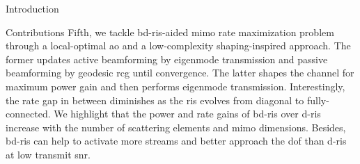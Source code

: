 \documentclass[journal]{IEEEtran}
\begin{document}
\begin{section}{Introduction}
\begin{subsection}{Contributions}
		Fifth, we tackle \gls{bd}-\gls{ris}-aided \gls{mimo} rate maximization problem through a local-optimal \gls{ao} and a low-complexity shaping-inspired approach.
		The former updates active beamforming by eigenmode transmission and passive beamforming by geodesic \gls{rcg} until convergence.
		The latter shapes the channel for maximum power gain and then performs eigenmode transmission.
		Interestingly, the rate gap in between diminishes as the \gls{ris} evolves from diagonal to fully-connected.
		We highlight that the power and rate gains of \gls{bd}-\gls{ris} over \gls{d}-\gls{ris} increase with the number of scattering elements and \gls{mimo} dimensions.
		Besides, \gls{bd}-\gls{ris} can help to activate more streams and better approach the \gls{dof} than \gls{d}-\gls{ris} at low transmit \gls{snr}.







\end{subsection}
\end{section}
\end{document}
